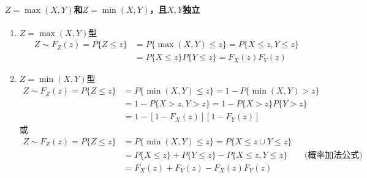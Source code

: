 \paragraph{$Z=\max(X,Y)$和$Z=\min(X,Y)$，且$X,Y$独立}
\begin{enumerate}[(1)]
    \item $Z=\max(X,Y)$型
          \begin{align*}
              Z\sim F_Z(z) = P\{Z\leq z\} & = P\{\max(X,Y)\leq z\} = P\{X\leq z, Y\leq z\} \\
                                          & = P\{X\leq z\}P\{Y\leq z\} = F_X(z)F_Y(z)
          \end{align*}
    \item $Z=\min(X,Y)$型
          \begin{align*}
              Z\sim F_Z(z) = P\{Z\leq z\} & = P\{\min(X,Y)\leq z\}=1- P\{\min(X,Y)> z\} \\
                                          & =1-P\{X>z, Y>z\} = 1-P\{X>z\}P\{Y>z\}       \\
                                          & = 1-[1-F_X(z)][1-F_Y(z)]
          \end{align*}
          或
          \begin{align*}
              Z\sim F_Z(z) = P\{Z\leq z\} & = P\{\min(X,Y)\leq z\}=P\{X\leq z \cup Y\leq z\}                                 \\
                                          & =P\{X\leq z\} +P\{Y \leq z\} - P\{X\leq z, Y\leq z\}\qquad \text{(概率加法公式)} \\
                                          & =F_X(z) + F_Y(z) - F_X(z)F_Y(z)
          \end{align*}
\end{enumerate}

